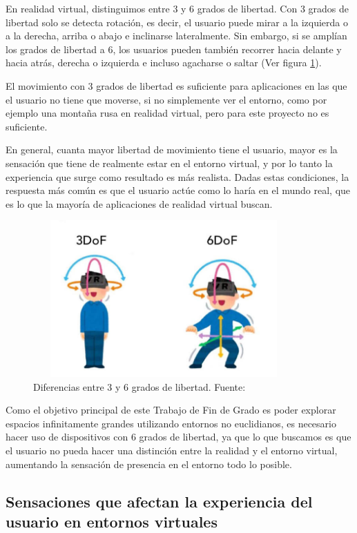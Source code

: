 \documentclass[../main.tex]{subfiles}
\begin{document}
En realidad virtual, distinguimos entre 3 y 6 grados de libertad. Con 3 grados de libertad solo se detecta rotación, es decir, el usuario puede mirar a la izquierda o a la derecha, arriba o abajo e inclinarse lateralmente. Sin embargo, si se amplían los grados de libertad a 6, los usuarios pueden también recorrer hacia delante y hacia atrás, derecha o izquierda e incluso agacharse o saltar \cite{DOF} (Ver figura \ref{fig:DOF}).

El movimiento con 3 grados de libertad es suficiente para aplicaciones en las que el usuario no tiene que moverse, si no simplemente ver el entorno, como por ejemplo una montaña rusa en realidad virtual, pero para este proyecto no es suficiente.

En general, cuanta mayor libertad de movimiento tiene el usuario, mayor es la sensación que tiene de realmente estar en el entorno virtual, y por lo tanto la experiencia que surge como resultado es más realista. Dadas estas condiciones, la respuesta más común es que el usuario actúe como lo haría en el mundo real, que es lo que la mayoría de aplicaciones de realidad virtual buscan.

\begin{figure}[h!]
\centering
\includegraphics[width=10cm, height=6cm]{imagenes/DOF.jpg}
\caption{Diferencias entre 3 y 6 grados de libertad. Fuente:\cite{DOF_image}}
\label{fig:DOF}
\end{figure}

Como el objetivo principal de este Trabajo de Fin de Grado es poder explorar espacios infinitamente grandes utilizando entornos no euclidianos, es necesario hacer uso de dispositivos con 6 grados de libertad, ya que lo que buscamos es que el usuario no pueda hacer una distinción entre la realidad y el entorno virtual, aumentando la sensación de presencia en el entorno todo lo posible.

\subsection{Sensaciones que afectan la experiencia del usuario en entornos virtuales}
\end{document}
